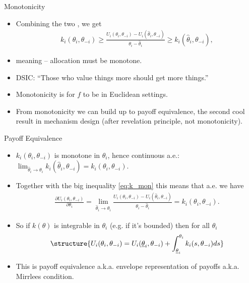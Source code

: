 \documentclass[english,10pt
,aspectratio=169
]{beamer}
\begin{document}
\begin{frame}{Monotonicity}
\begin{itemize}
	\item Combining the two , we get
	{\small \vspace{-0.5em}\begin{align}
		\label{eq:k_mon}
			k_i(\theta_i,\theta_{-i}) 
			\geq 
			\frac{ U_i(\theta_i, \theta_{-i}) - U_i(\hat{\theta}_i, \theta_{-i}) }{ \theta_i - \hat{\theta}_i } 
			\geq 
			k_i(\hat{\theta}_i,\theta_{-i}),
		\end{align}\vspace{-1em}}
	\pause
	\item meaning  -- allocation must be \alert{monotone}.
	\item DSIC: ``Those who value things more should get more things.''
	\item \alert{Monotonicity} is  for $f$ to be  in \alert{Euclidean} settings.
	\item From monotonicity we can build up to \alert{payoff equivalence}, 
	the second cool result in mechanism design (after revelation principle, not monotonicity).
\end{itemize}
\end{frame}


\begin{frame}{Payoff Equivalence}
\begin{itemize}
	\item $k_i(\theta_i,\theta_{-i})$ is monotone in $\theta_i$, hence continuous a.e.: $\lim_{\hat{\theta}_i \to \theta_i} k_i(\hat{\theta}_i,\theta_{-i}) = k_i(\theta_i,\theta_{-i})$.
	\pause
	\item Together with the big inequality \eqref{eq:k_mon}	this means that a.e. we have
	\pause
	\begin{align*}
		\frac{\partial U_i(\theta_i,\theta_{-i})}{\partial \theta_i} = \lim_{\hat{\theta}_i \to \theta_i} \frac{ U_i(\theta_i, \theta_{-i}) - U_i(\hat{\theta}_i, \theta_{-i}) }{ \theta_i - \hat{\theta}_i }  = k_i(\theta_i,\theta_{-i}).
	\end{align*}
	\pause
	\item So if $k(\theta)$ is integrable in $\theta_i$ (e.g. if it's bounded) then for all $\theta_i$
	\begin{align*}
	\structure{
		U_i(\theta_i, \theta_{-i}) = U_i (\underline{\theta}_i,\theta_{-i}) + \int_{\underline{\theta}_i}^{\theta_i} k_i(s,\theta_{-i}) d s
	}
	\end{align*}
	\item This is \alert{payoff equivalence} a.k.a. envelope representation of payoffs a.k.a. Mirrlees condition.
\end{itemize}
\end{frame}
\end{document}
